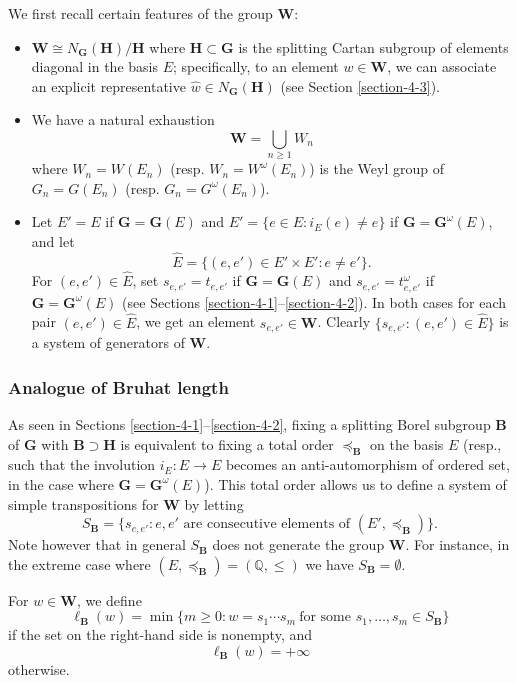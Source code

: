 \documentclass[12pt]{amsart}
\theoremstyle{definition}
\begin{document}
We first recall certain features of the group $\mathbf{W}$:
\begin{itemize}
\item $\mathbf{W}\cong N_\mathbf{G}(\mathbf{H})/\mathbf{H}$ where $\mathbf{H}\subset\mathbf{G}$ is the splitting Cartan subgroup of elements diagonal in the basis $E$; specifically, to an element $w\in\mathbf{W}$, we can associate an explicit representative $\hat{w}\in N_\mathbf{G}(\mathbf{H})$ (see Section \ref{section-4-3}).
\item We have a natural exhaustion
\[\mathbf{W}=\bigcup_{n\geq 1}W_n\]
where $W_n=W(E_n)$ (resp. $W_n=W^\omega(E_n)$) is the Weyl group of $G_n=G(E_n)$ (resp. $G_n=G^\omega(E_n)$).
\item
Let $E'=E$ if $\mathbf{G}=\mathbf{G}(E)$ and $E'=\{e\in E:i_E(e)\not=e\}$ if $\mathbf{G}=\mathbf{G}^\omega(E)$, and let
\[\hat{E}=\{(e,e')\in E'\times E':e\not=e'\}.\]
For $(e,e')\in\hat{E}$, set $s_{e,e'}=t_{e,e'}$ if $\mathbf{G}=\mathbf{G}(E)$ and $s_{e,e'}=t^\omega_{e,e'}$ if $\mathbf{G}=\mathbf{G}^\omega(E)$ (see Sections \ref{section-4-1}--\ref{section-4-2}).
In both cases  for each pair $(e,e')\in\hat{E}$, we get an element $s_{e,e'}\in\mathbf{W}$. Clearly $\{s_{e,e'}:(e,e')\in\hat{E}\}$ is a system of generators of $\mathbf{W}$.
\end{itemize}

\subsubsection{Analogue of Bruhat length}

As seen in Sections \ref{section-4-1}--\ref{section-4-2}, fixing a splitting Borel subgroup $\mathbf{B}$ of $\mathbf{G}$ with $\mathbf{B}\supset\mathbf{H}$ is equivalent to fixing a total order $\preceq_\mathbf{B}$ on the basis $E$ (resp., such that the involution $i_E:E\to E$ becomes an anti-automorphism of ordered set, in the case where $\mathbf{G}=\mathbf{G}^\omega(E)$).
This total order allows us to define a system of simple transpositions for $\mathbf{W}$ by letting
\[S_\mathbf{B}=\{s_{e,e'}:\mbox{$e,e'$ are consecutive elements of $(E',\preceq_\mathbf{B})$}\}.\]
Note however that in general $S_\mathbf{B}$ does not generate the group $\mathbf{W}$. 
For instance, in the extreme case where $(E,\preceq_\mathbf{B})=(\mathbb{Q},\leq)$ we have $S_\mathbf{B}=\emptyset$.

For  $w\in\mathbf{W}$, we define
\[\ell_\mathbf{B}(w)=\min\{m\geq 0:w=s_1\cdots s_m\ \mbox{for some $s_1,\ldots,s_m\in S_\mathbf{B}$}\}\]
if the set on the right-hand side is nonempty, and
\[\ell_\mathbf{B}(w)=+\infty\]
otherwise.
\end{document}
